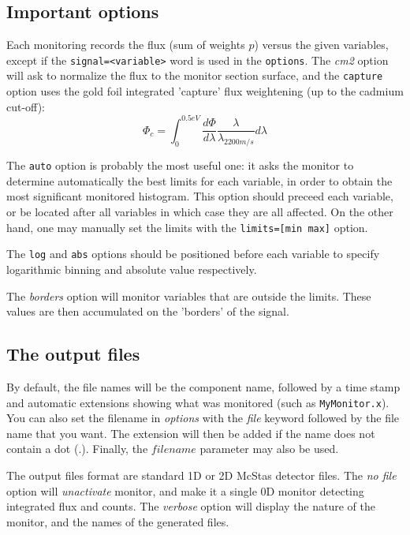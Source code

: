 \subsection{Important options}

Each monitoring records the flux (sum of weights $p$) versus the
given variables, except if the \verb+signal=<variable>+ word is used in the \verb+options+.
The {\it cm2} option will ask to normalize the flux to the monitor section surface, and the \verb+capture+ option uses the gold foil integrated 'capture' flux weightening (up to the cadmium cut-off):
\begin{equation}
\Phi_c = \int_0^{0.5 eV}{\frac{d\Phi}{d\lambda} \frac{\lambda}{\lambda_{2200 m/s}} d\lambda}
\end{equation}

The \verb+auto+ option is probably the most useful one: it asks the monitor to determine automatically the best limits for each variable, in order to obtain the most significant monitored histogram. This option should preceed each variable, or be located after all variables in which case they are all affected.
On the other hand, one may manually set the limits with the \verb+limits=[min max]+ option.

The \verb+log+ and \verb+abs+ options should be positioned before each variable to specify logarithmic binning and absolute value respectively.

The {\it borders} option will monitor variables that are outside
the limits. These values are then accumulated on the 'borders' of the
signal.

\subsection{The output files}

By default, the file names will be the component name, followed by a time stamp and
automatic extensions showing what was monitored (such as
\texttt{MyMonitor.x}). You can also set the filename in {\it options}
with the {\it file} keyword followed by the file name that you want. The
extension will then be added if the name does not contain a dot (.).
Finally, the $filename$ parameter may also be used.

The output files format are standard 1D or 2D McStas detector files.
The {\it no file} option will {\it unactivate} monitor, and make it a
single 0D monitor detecting integrated flux and counts.
The {\it verbose} option will display the nature of the monitor, and the
names of the generated files.

